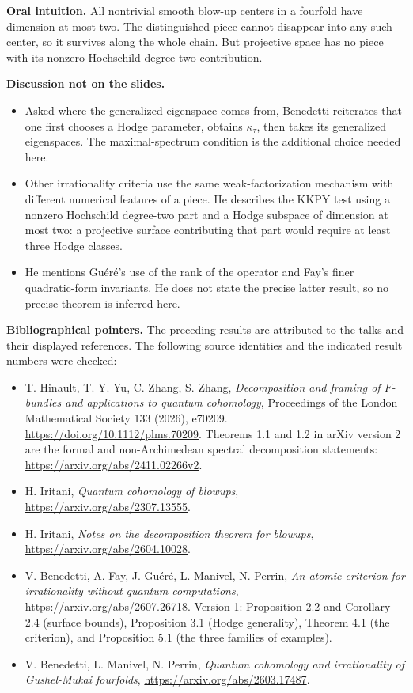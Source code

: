 \textbf{Oral intuition.}
All nontrivial smooth blow-up centers in a
fourfold have dimension at most two.
The distinguished piece cannot disappear
into any such center, so it survives along
the whole chain. But projective space has
no piece with its nonzero Hochschild
degree-two contribution.

\medskip\noindent
\textbf{Discussion not on the slides.}
\begin{itemize}
\item Asked where the generalized eigenspace
comes from, Benedetti reiterates that one
first chooses a Hodge parameter, obtains
$\kappa_\tau$, then takes its generalized
eigenspaces. The maximal-spectrum condition
is the additional choice needed here.
\item Other irrationality criteria use the
same weak-factorization mechanism with
different numerical features of a piece.
He describes the KKPY test using a nonzero
Hochschild degree-two part and a Hodge
subspace of dimension at most two: a
projective surface contributing that part
would require at least three Hodge classes.
\item He mentions Gu\'er\'e's use of the
rank of the operator and Fay's finer
quadratic-form invariants. He does not
state the precise latter result, so no
precise theorem is inferred here.
\end{itemize}

\medskip\noindent
\textbf{Bibliographical pointers.}
The preceding results are attributed to
the talks and their displayed references.
The following source identities and the
indicated result numbers were checked:
\begin{itemize}
\item T. Hinault, T. Y. Yu, C. Zhang,
S. Zhang,
\emph{Decomposition and framing of
$F$-bundles and applications to quantum
cohomology}, Proceedings of the London
Mathematical Society 133 (2026), e70209.
\url{https://doi.org/10.1112/plms.70209}.
Theorems 1.1 and 1.2 in arXiv version 2
are the formal and non-Archimedean
spectral decomposition statements:
\url{https://arxiv.org/abs/2411.02266v2}.
\item H. Iritani,
\emph{Quantum cohomology of blowups},
\url{https://arxiv.org/abs/2307.13555}.
\item H. Iritani,
\emph{Notes on the decomposition theorem
for blowups},
\url{https://arxiv.org/abs/2604.10028}.
\item V. Benedetti, A. Fay, J. Gu\'er\'e,
L. Manivel, N. Perrin,
\emph{An atomic criterion for irrationality
without quantum computations},
\url{https://arxiv.org/abs/2607.26718}.
Version 1: Proposition 2.2 and Corollary 2.4
(surface bounds), Proposition 3.1
(Hodge generality), Theorem 4.1
(the criterion), and Proposition 5.1
(the three families of examples).
\item V. Benedetti, L. Manivel, N. Perrin,
\emph{Quantum cohomology and irrationality
of Gushel-Mukai fourfolds},
\url{https://arxiv.org/abs/2603.17487}.
\end{itemize}

